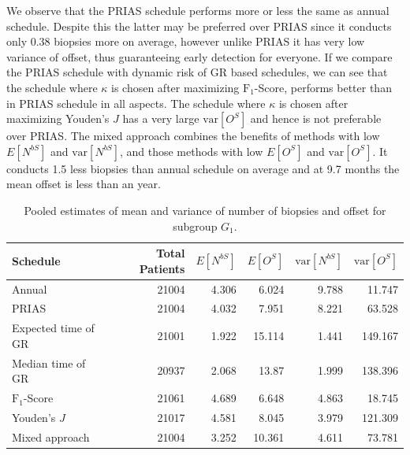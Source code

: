 We observe that the PRIAS schedule performs more or less the same as annual schedule. Despite this the latter may be preferred over PRIAS since it conducts only 0.38 biopsies more on average, however unlike PRIAS it has very low variance of offset, thus guaranteeing early detection for everyone. If we compare the PRIAS schedule with dynamic risk of GR based schedules, we can see that the schedule where $\kappa$ is chosen after maximizing $\text{F}_1$-Score, performs better than in PRIAS schedule in all aspects. The schedule where $\kappa$ is chosen after maximizing Youden's $J$ has a very large $\mbox{var}[O^S]$ and hence is not preferable over PRIAS. The mixed approach combines the benefits of methods with low $E[N^{bS}]$ and $\mbox{var}[N^{bS}]$, and those methods with low $E[O^{S}]$ and $\mbox{var}[O^S]$. It conducts 1.5 less biopsies than annual schedule on average and at 9.7 months the mean offset is less than an year.\\

\begin{table}[!htb]
\centering
\captionsetup{justification=centering}
\caption{Pooled estimates of mean and variance of number of biopsies and offset for subgroup $G_1$.}
\label{table : sim_study_pooled_estimates_G1}
\begin{tabular}{@{}lrrrrr@{}}
\toprule
Schedule           & Total Patients & $E[N^{bS}]$ & $E[O^{S}]$ & $\mbox{var}[N^{bS}]$ & $\mbox{var}[O^S]$ \\ \midrule
Annual              & 21004                  & 4.306           & 6.024               & 9.788          & 11.747             \\
PRIAS              & 21004                  & 4.032           & 7.951               & 8.221          & 63.528             \\
Expected time of GR & 21001                  & 1.922           & 15.114              & 1.441          & 149.167            \\
Median time of GR  & 20937                  & 2.068           & 13.87               & 1.999          & 138.396            \\
$\text{F}_1$-Score           & 21061                  & 4.689           & 6.648               & 4.863          & 18.745             \\
Youden's $J$             & 21017                  & 4.581           & 8.045               & 3.979          & 121.309            \\
Mixed approach     & 21004                  & 3.252           & 10.361              & 4.611          & 73.781             \\ \bottomrule
\end{tabular}
\end{table}

